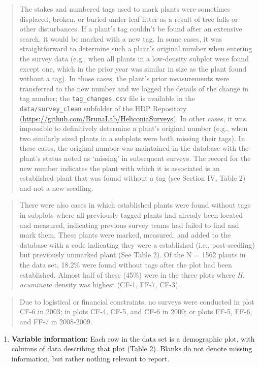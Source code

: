 \documentclass[
  12pt,
  man, donotrepeattitle,floatsintext]{apa6}
\providecommand{\tightlist}{%
  \setlength{\itemsep}{0pt}\setlength{\parskip}{0pt}}
\begin{document}
\begin{quote}
The stakes and numbered tags used to mark plants were sometimes displaced, broken, or buried under leaf litter as a result of tree falls or other disturbances. If a plant's tag couldn't be found after an extensive search, it would be marked with a new tag. In some cases, it was straightforward to determine such a plant's original number when entering the survey data (e.g., when all plants in a low-density subplot were found except one, which in the prior year was similar in size as the plant found without a tag). In those cases, the plant's prior measurements were transferred to the new number and we logged the details of the change in tag number; the \texttt{tag\_changes.csv} file is available in the \texttt{data/survey\_clean} subfolder of the HDP Repository (\url{https://github.com/BrunaLab/HeliconiaSurveys}). In other cases, it was impossible to definitively determine a plant's original number (e.g., when two similarly sized plants in a subplots were both missing their tags). In these cases, the original number was maintained in the database with the plant's status noted as `missing' in subsequent surveys. The record for the new number indicates the plant with which it is associated is an established plant that was found without a tag (see Section IV, Table 2) and not a new seedling.
\end{quote}

\begin{quote}
There were also cases in which established plants were found without tags in subplots where all previously tagged plants had already been located and measured, indicating previous survey teams had failed to find and mark them. These plants were marked, measured, and added to the database with a code indicating they were a established (i.e., post-seedling) but previously unmarked plant (See Table 2). Of the N = 1562 plants in the data set, 18.2\% were found without tags after the plot had been established. Almost half of these (45\%) were in the three plots where \emph{H. acuminata} density was highest (CF-1, FF-7, CF-3).
\end{quote}

\begin{quote}
Due to logistical or financial constraints, no surveys were conducted in plot CF-6 in 2003; in plots CF-4, CF-5, and CF-6 in 2000; or plots FF-5, FF-6, and FF-7 in 2008-2009.
\end{quote}

\begin{enumerate}
\def\labelenumi{\arabic{enumi}.}
\setcounter{enumi}{9}
\tightlist
\item
  \textbf{Variable information:} Each row in the data set is a demographic plot, with columns of data describing that plot (Table 2). Blanks do not denote missing information, but rather nothing relevant to report.
\end{enumerate}
\end{document}
